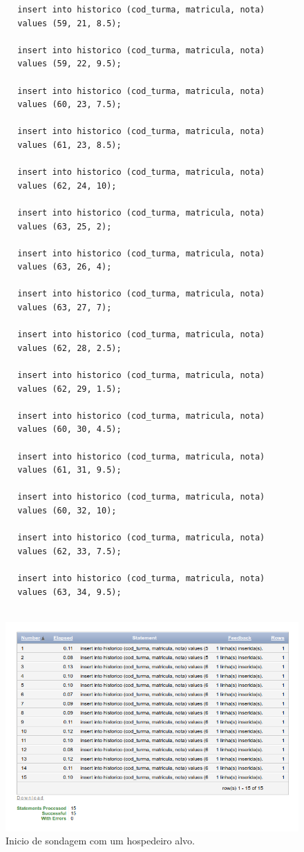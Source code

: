 \documentclass[
article,			%
11pt,				%
oneside,			%
a4paper,			%
english,			%
brazil,				%
sumario=tradicional
]{abntex2}
\begin{document}
\begin{enumerate}
		\begin{verbatim}
		insert into historico (cod_turma, matricula, nota)
		values (59, 21, 8.5);
		
		insert into historico (cod_turma, matricula, nota)
		values (59, 22, 9.5);
		
		insert into historico (cod_turma, matricula, nota)
		values (60, 23, 7.5);
		
		insert into historico (cod_turma, matricula, nota)
		values (61, 23, 8.5);
		
		insert into historico (cod_turma, matricula, nota)
		values (62, 24, 10);
		
		insert into historico (cod_turma, matricula, nota)
		values (63, 25, 2);
		
		insert into historico (cod_turma, matricula, nota)
		values (63, 26, 4);
		
		insert into historico (cod_turma, matricula, nota)
		values (63, 27, 7);
		
		insert into historico (cod_turma, matricula, nota)
		values (62, 28, 2.5);
		
		insert into historico (cod_turma, matricula, nota)
		values (62, 29, 1.5);
		
		insert into historico (cod_turma, matricula, nota)
		values (60, 30, 4.5);
		
		insert into historico (cod_turma, matricula, nota)
		values (61, 31, 9.5);
		
		insert into historico (cod_turma, matricula, nota)
		values (60, 32, 10);
		
		insert into historico (cod_turma, matricula, nota)
		values (62, 33, 7.5);
		
		insert into historico (cod_turma, matricula, nota)
		values (63, 34, 9.5);​
		​
		\end{verbatim}
		\vspace{0.0cm}
		\begin{center}
			\begin{figure}[H]
				\centering
				\includegraphics[scale=0.5]{./at-05.png}
				\caption{Inicio de sondagem com um hospedeiro alvo.}
				\label{rota-1}
			\end{figure}
		\end{center}
\end{enumerate}
	
		

	
	
\end{document}

